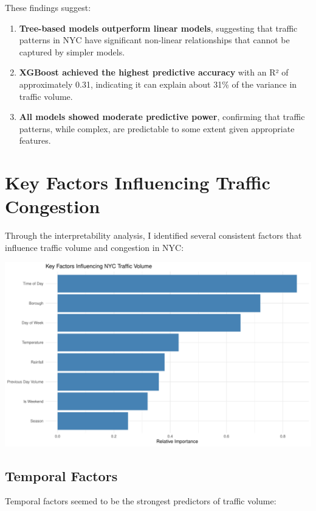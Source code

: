 \documentclass[
  letterpaper,
  DIV=11,
  numbers=noendperiod]{scrreprt}
\begin{document}
These findings suggest:

\begin{enumerate}
\def\labelenumi{\arabic{enumi}.}
\item
  \textbf{Tree-based models outperform linear models}, suggesting that
  traffic patterns in NYC have significant non-linear relationships that
  cannot be captured by simpler models.
\item
  \textbf{XGBoost achieved the highest predictive accuracy} with an R²
  of approximately 0.31, indicating it can explain about 31\% of the
  variance in traffic volume.
\item
  \textbf{All models showed moderate predictive power}, confirming that
  traffic patterns, while complex, are predictable to some extent given
  appropriate features.
\end{enumerate}

\section{Key Factors Influencing Traffic
Congestion}\label{key-factors-influencing-traffic-congestion}

Through the interpretability analysis, I identified several consistent
factors that influence traffic volume and congestion in NYC:

\includegraphics[width=1\textwidth,height=\textheight]{figures/key-factors-1.pdf}

\subsection{Temporal Factors}\label{temporal-factors}

Temporal factors seemed to be the strongest predictors of traffic
volume:
\end{document}
